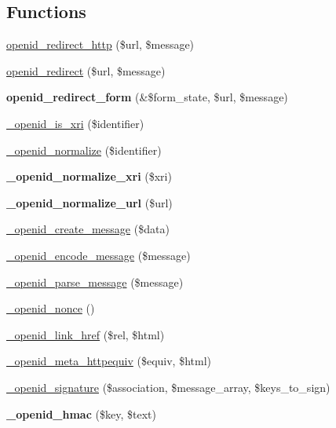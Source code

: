 \subsection*{Functions}
\begin{CompactItemize}
\item 
\hyperlink{openid_8inc_3c8b7c23742c62aae323c74c8c0f9915}{openid\_\-redirect\_\-http} (\$url, \$message)
\item 
\hyperlink{openid_8inc_6836e61a578613959fe00ca83209ae2f}{openid\_\-redirect} (\$url, \$message)
\item 
\hypertarget{openid_8inc_52777d750ac2d4fd5f75794116fa04cb}{
\textbf{openid\_\-redirect\_\-form} (\&\$form\_\-state, \$url, \$message)}
\label{openid_8inc_52777d750ac2d4fd5f75794116fa04cb}

\item 
\hyperlink{openid_8inc_867ccbcc067a82d3bc691a6cdc1ad9f4}{\_\-openid\_\-is\_\-xri} (\$identifier)
\item 
\hyperlink{openid_8inc_ba14f184dc28aa90da400e857cb3b537}{\_\-openid\_\-normalize} (\$identifier)
\item 
\hypertarget{openid_8inc_a423503af225609f1fc7044ecf4e6ceb}{
\textbf{\_\-openid\_\-normalize\_\-xri} (\$xri)}
\label{openid_8inc_a423503af225609f1fc7044ecf4e6ceb}

\item 
\hypertarget{openid_8inc_c27e44e57989bc26d02dcec5d3a9ed5f}{
\textbf{\_\-openid\_\-normalize\_\-url} (\$url)}
\label{openid_8inc_c27e44e57989bc26d02dcec5d3a9ed5f}

\item 
\hyperlink{openid_8inc_5d5952e825b3e17cc2765760baf69d4f}{\_\-openid\_\-create\_\-message} (\$data)
\item 
\hyperlink{openid_8inc_367a73e53a7544157b49ffbedcbdb444}{\_\-openid\_\-encode\_\-message} (\$message)
\item 
\hyperlink{openid_8inc_b5f88df8b540f08bd28e8a508bb49175}{\_\-openid\_\-parse\_\-message} (\$message)
\item 
\hyperlink{openid_8inc_7f413b6dbcae0aab572b51b57f08b076}{\_\-openid\_\-nonce} ()
\item 
\hyperlink{openid_8inc_413931ae272accf7e4161d5b032d4631}{\_\-openid\_\-link\_\-href} (\$rel, \$html)
\item 
\hyperlink{openid_8inc_cbf79310505895f32ef771f12addd3bc}{\_\-openid\_\-meta\_\-httpequiv} (\$equiv, \$html)
\item 
\hyperlink{openid_8inc_94a239a1dacef65306d0078198035cc7}{\_\-openid\_\-signature} (\$association, \$message\_\-array, \$keys\_\-to\_\-sign)
\item 
\hypertarget{openid_8inc_2294d8c885fe408e7e1981e51e880ebc}{
\textbf{\_\-openid\_\-hmac} (\$key, \$text)}
\label{openid_8inc_2294d8c885fe408e7e1981e51e880ebc}


\end{CompactItemize}
